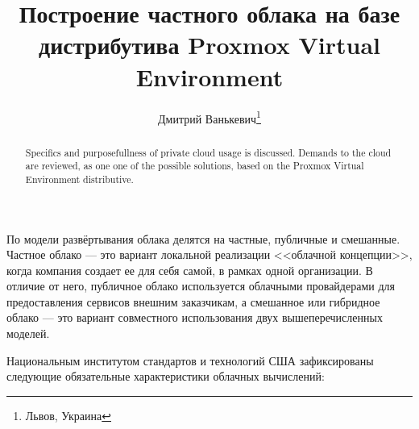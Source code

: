 \documentclass[10pt, a5paper]{article}
\begin{document}
\title{Построение частного облака на базе дистрибутива Proxmox Virtual Environment}%

\author{Дмитрий Ванькевич\footnote{Львов, Украина}}
\maketitle

\begin{abstract}
Specifics and purposefullness of private cloud usage is discussed. Demands to the cloud are reviewed, as one one of the possible solutions, based on the Proxmox Virtual Environment distributive.
\end{abstract}


По модели развёртывания облака делятся на частные, публичные и смешанные.
Частное облако --- это вариант локальной реализации <<облачной концепции>>, когда компания создает ее для себя самой, в рамках одной организации. В отличие от него, публичное облако используется облачными провайдерами для предоставления сервисов внешним заказчикам, а смешанное или гибридное облако --- это вариант совместного использования двух вышеперечисленных моделей.

Национальным институтом стандартов и технологий США зафиксированы следующие обязательные характеристики облачных вычислений:
\end{document}
